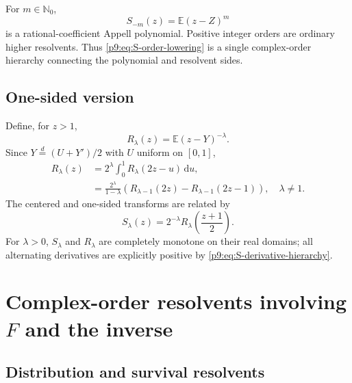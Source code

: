 \documentclass[11pt,oneside]{article}
\theoremstyle{definition}
\theoremstyle{remark}
\newcommand{\E}{\mathbb E}
\newcommand{\N}{\mathbb N}
\newcommand{\dd}{\,\mathrm d}
\newcommand{\1}{\mathbf 1}
\begin{document}
\begin{remark}
For $m\in\N_0$,
\begin{equation}
 S_{-m}(z)=\E(z-Z)^m
 \label{p9:eq:S-negative-polynomial}
\end{equation}
is a rational-coefficient Appell polynomial.  Positive integer orders are
ordinary higher resolvents.  Thus \cref{p9:eq:S-order-lowering} is a single
complex-order hierarchy connecting the polynomial and resolvent sides.
\end{remark}

\subsection{One-sided version}

Define, for $z>1$,
\begin{equation}
 R_\lambda(z)=\E(z-Y)^{-\lambda}.
 \label{p9:eq:R-lambda}
\end{equation}
Since $Y\overset d=(U+Y')/2$ with $U$ uniform on $[0,1]$,
\begin{align}
 R_\lambda(z)
 &=2^\lambda\int_0^1R_\lambda(2z-u)\dd u,
 \label{p9:eq:R-integral-refinement}\\
 &=\frac{2^\lambda}{1-\lambda}
   \left(R_{\lambda-1}(2z)-R_{\lambda-1}(2z-1)\right),
 \quad \lambda\ne1.
 \label{p9:eq:R-order-lowering}
\end{align}
The centered and one-sided transforms are related by
\begin{equation}
 S_\lambda(z)=2^{-\lambda}
 R_\lambda\!\left(\frac{z+1}{2}\right).
 \label{p9:eq:S-R-relation}
\end{equation}
For $\lambda>0$, $S_\lambda$ and $R_\lambda$ are completely monotone on their
real domains; all alternating derivatives are explicitly positive by
\cref{p9:eq:S-derivative-hierarchy}.

\section{Complex-order resolvents involving \texorpdfstring{$F$}{F} and the inverse}
\label{p9:sec:complex-resolvents}

\subsection{Distribution and survival resolvents}
\end{document}
